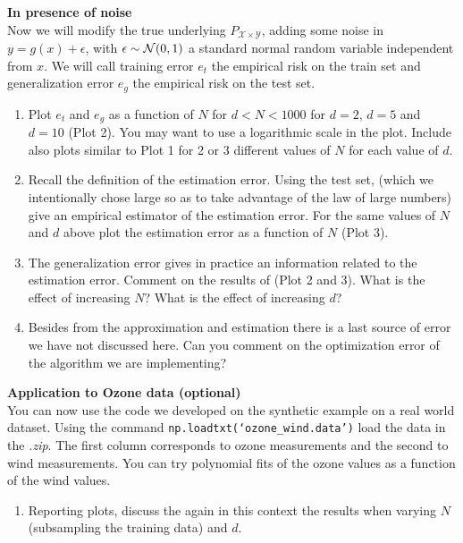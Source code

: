 \documentclass{article}
\begin{document}
\textbf{\color{nyupurple} In presence of noise}\\
Now we will modify the true underlying $P_{\mathcal{X} \times \mathcal{Y}}$, adding some noise in $y = g(x) + \epsilon$, with $\epsilon \sim {\mathcal{N}}(0,1)$ a standard normal random variable independent from $x$. We will call training error $e_t$ the empirical risk on the train set and generalization error $e_g$ the empirical risk on the test set.
\begin{enumerate}
\setcounter{enumi}{\value{saveenum}}
    \item Plot $e_t$ and $e_g$ as a function of $N$ for $d < N < 1000$ for $d = 2$, $d=5$ and $d=10$ (Plot 2). You may want to use a logarithmic scale in the plot. Include also plots similar to Plot 1 for 2 or 3 different values of $N$ for each value of $d$. 
    
    \item Recall the definition of the estimation error. Using the test set, (which we intentionally chose large so as to take advantage of the law of large numbers) give an empirical estimator of the estimation error. For the same values of $N$ and $d$ above plot the estimation error as a function of $N$ (Plot 3).
    
    \item The generalization error gives in practice an information related to the estimation error. Comment on the results of (Plot 2 and 3). What is the effect of increasing $N$? What is the effect of increasing $d$?
    
    \item Besides from the approximation and estimation there is a last source of error we have not discussed here. Can you comment on the optimization error of the algorithm we are implementing?
    
\setcounter{saveenum}{\value{enumi}}    
\end{enumerate}

\textbf{\color{nyupurple} Application to Ozone data (optional)}\\
You can now use the code we developed on the synthetic example on a real world dataset. Using the command \texttt{np.loadtxt(`ozone\_wind.data')} load the data in the \emph{.zip}. The first column corresponds to ozone measurements and the second to wind measurements. You can try polynomial fits of the ozone values as a function of the wind values. 

\begin{enumerate}
\setcounter{enumi}{\value{saveenum}}
    \item Reporting plots, discuss the again in this context the results when varying $N$ (subsampling the training data) and $d$. 
\end{enumerate}
\end{document}
